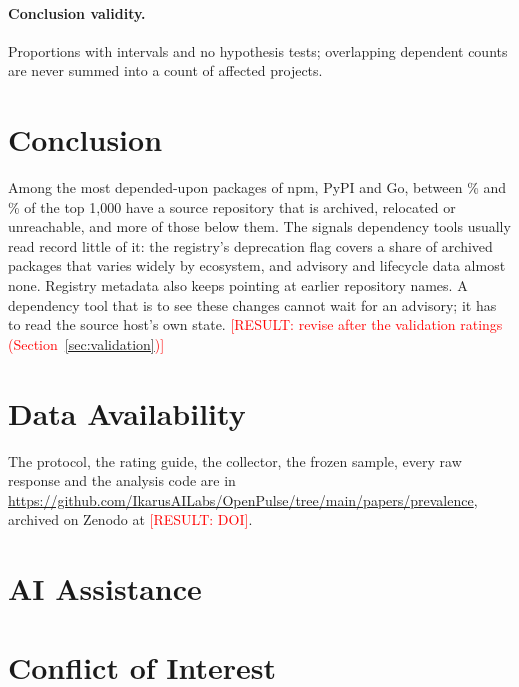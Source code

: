 \documentclass[11pt,a4paper]{article}
\newcommand{\result}[1]{\textcolor{red}{[RESULT: #1]}}
\begin{document}
\paragraph{Conclusion validity.} Proportions with intervals and no
hypothesis tests; overlapping dependent counts are never summed into a
count of affected projects.

\section{Conclusion}
\label{sec:conclusion}
Among the most depended-upon packages of npm, PyPI and Go, between
\% and \% of the top 1,000 have a source
repository that is archived, relocated or unreachable, and more of those
below them. The signals dependency tools usually read record little of
it: the registry's deprecation flag covers a share of archived packages
that varies widely by ecosystem, and advisory and lifecycle data almost
none. Registry metadata also keeps pointing at earlier repository names.
A dependency tool that is to see these changes cannot wait for an
advisory; it has to read the source host's own state.
\result{revise after the validation ratings (Section~\ref{sec:validation})}

\section*{Data Availability}
The protocol, the rating guide, the collector, the frozen sample, every
raw response and the analysis code are in
\url{https://github.com/IkarusAILabs/OpenPulse/tree/main/papers/prevalence},
archived on Zenodo at \result{DOI}.

\section*{AI Assistance}

\section*{Conflict of Interest}
\end{document}
